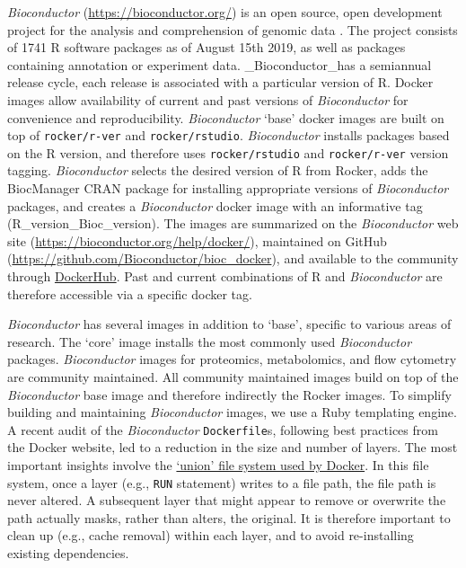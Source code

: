 \emph{Bioconductor} (\url{https://bioconductor.org/}) is an open source,
open development project for the analysis and comprehension of genomic
data \citep{gentleman_bioconductor_2004}. The project consists of 1741 R
software packages as of August 15th 2019, as well as packages containing
annotation or experiment data. \_Bioconductor\_has a semiannual release
cycle, each release is associated with a particular version of R. Docker
images allow availability of current and past versions of
\emph{Bioconductor} for convenience and reproducibility.
\emph{Bioconductor} `base' docker images are built on top of
\texttt{rocker/r-ver} and \texttt{rocker/rstudio}. \emph{Bioconductor}
installs packages based on the R version, and therefore uses
\texttt{rocker/rstudio} and \texttt{rocker/r-ver} version tagging.
\emph{Bioconductor} selects the desired version of R from Rocker, adds
the BiocManager CRAN package for installing appropriate versions of
\emph{Bioconductor} packages, and creates a \emph{Bioconductor} docker
image with an informative tag (R\_version\_Bioc\_version). The images
are summarized on the \emph{Bioconductor} web site
(\url{https://bioconductor.org/help/docker/}), maintained on GitHub
(\url{https://github.com/Bioconductor/bioc_docker}), and available to
the community through \href{https://hub.docker.com/}{DockerHub}. Past
and current combinations of R and \emph{Bioconductor} are therefore
accessible via a specific docker tag.

\emph{Bioconductor} has several images in addition to `base', specific
to various areas of research. The `core' image installs the most
commonly used \emph{Bioconductor} packages. \emph{Bioconductor} images
for proteomics, metabolomics, and flow cytometry are community
maintained. All community maintained images build on top of the
\emph{Bioconductor} base image and therefore indirectly the Rocker
images. To simplify building and maintaining \emph{Bioconductor} images,
we use a Ruby templating engine. A recent audit of the
\emph{Bioconductor} \texttt{Dockerfile}s, following best practices from
the Docker website, led to a reduction in the size and number of layers.
The most important insights involve the
\href{https://docs.docker.com/storage/storagedriver/overlayfs-driver/\#how-container-reads-and-writes-work-with-overlay-or-overlay2}{`union'
file system used by Docker}. In this file system, once a layer (e.g.,
\texttt{RUN} statement) writes to a file path, the file path is never
altered. A subsequent layer that might appear to remove or overwrite the
path actually masks, rather than alters, the original. It is therefore
important to clean up (e.g., cache removal) within each layer, and to
avoid re-installing existing dependencies.

